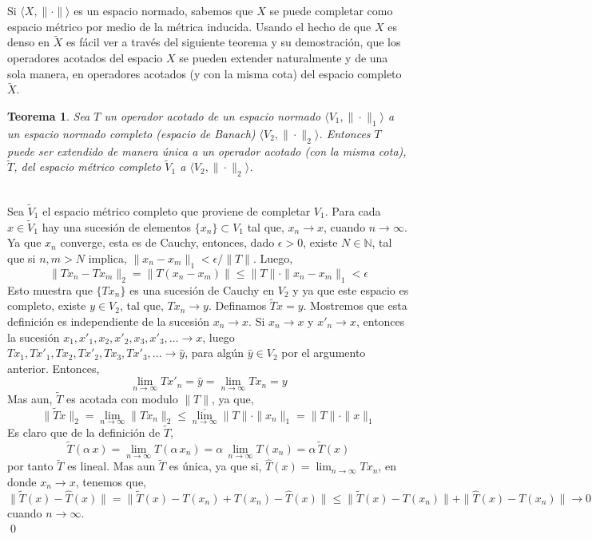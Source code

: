 \documentclass[12pt]{book}
\numberwithin{equation}{chapter}
\newtheorem{theorem}{Teorema}[chapter]
\def\n{\noindent}
\def\la{\langle}
\def\ra{\rangle}
\def\rar{\rightarrow}
\begin{document}
\vspace{5 mm}
 
Si $\la X,\| \cdot \| \ra$ es un espacio normado, sabemos que $X$ se puede completar como espacio m\'etrico por medio de la m\'etrica inducida. Usando el hecho de que $X$ es denso en $\tilde{X}$ es f\'acil ver a trav\'es del siguiente teorema y su demostraci\'on, que los operadores acotados del espacio $X$ se pueden extender naturalmente y de una sola manera, en operadores acotados (y con la misma cota) del espacio completo $\tilde{X}$.

\begin{theorem}
Sea $T$ un operador acotado de un espacio normado $ \la V_{1},\| \cdot \|_{1} \ra $ a un espacio normado completo (espacio de Banach) $ \la V_{2},\| \cdot \|_{2} \ra $. Entonces $T$ puede ser extendido de manera \'unica a un operador acotado (con la misma cota), $\tilde{T}$, del espacio m\'etrico completo $\tilde{V}_{1}$ a $\la V_{2},\| \cdot \|_{2} \ra$.
\end{theorem}
\n {\bf Demostraci\'on}\\
Sea $\tilde{V}_{1}$ el espacio m\'etrico completo que proviene de completar $V_{1}$. Para cada $x \in \tilde{V}_{1}$ hay una sucesi\'on de elementos $\{x_{n}\} \subset V_{1}$ tal que, $ x_{n} \rar x $, cuando $ n \rar \infty $. Ya que $x_{n}$ converge, esta es de Cauchy, entonces, dado $\epsilon >0$, existe $N \in \mathbb{N}$, tal que si $ n,m > N $ implica, $ \| x_{n}-x_{m} \|_{1} < \epsilon / \|T\| $. Luego, 
$$ \| Tx_{n}-Tx_{m} \|_{2}=\| T(x_{n}-x_{m}) \| \leq \|T\| \cdot \| x_{n}-x_{m} \|_{1} < \epsilon $$
Esto muestra que $\{Tx_{n}\} $ es una sucesi\'on de Cauchy en $V_{2}$ y ya que este espacio es completo, existe $ y \in V_{2} $, tal que, $ Tx_{n} \rar y $. Definamos $ \tilde{T}x=y $. Mostremos que esta definici\'on es independiente de la sucesi\'on $ x_{n} \rar x $. Si $x_{n} \rar x $ y $x'_{n} \rar x $, entonces la sucesi\'on $ x_{1},x'_{1},x_{2},x'_{2},x_{3},x'_{3},... \rar x $, luego $ Tx_{1},Tx'_{1},Tx_{2},Tx'_{2},Tx_{3},Tx'_{3},... \rar \hat{y}$, para alg\'un $\hat{y} \in V_{2}$ por el argumento anterior. Entonces,
$$ \lim_{n \rar \infty}Tx'_{n}= \hat{y}= \lim_{n \rar \infty}Tx_{n}= y$$
Mas aun, $\tilde{T}$ es acotada con modulo $\|T\|$, ya que,
$$ \| \tilde{T}x \|_{2}=\lim_{n \rar \infty} \| Tx_{n} \|_{2} \leq \overline{\lim_{n \rar \infty}} \|T\| \cdot \|x_{n}\|_{1}= \|T\|\cdot \|x\|_{1} $$ 
Es claro que de la definici\'on de $\tilde{T}$,
$$ \tilde{T}(\alpha \, x)=\lim_{n \rar \infty} T(\alpha\, x_{n}) = \alpha \, \lim_{n \rar \infty} T( x_{n})= \alpha \, \tilde{T}(x) $$
por tanto $\tilde{T}$ es lineal. Mas aun $\tilde{T}$ es \'unica, ya que si, $ \hat{T}(x)= \lim_{n \rar \infty} Tx_{n} $, en donde $ x_{n} \rar x $, tenemos que,
$$ \| \tilde{T}(x) - \hat{T}(x) \| = \| \tilde{T}(x)-T(x_{n})+T(x_{n})-\hat{T}(x) \|\leq \| \tilde{T}(x)-T(x_{n})\| + \|\hat{T}(x)-T(x_{n}) \| \rar 0 $$
cuando $n \rar \infty$. \\ \qed
\end{document}
